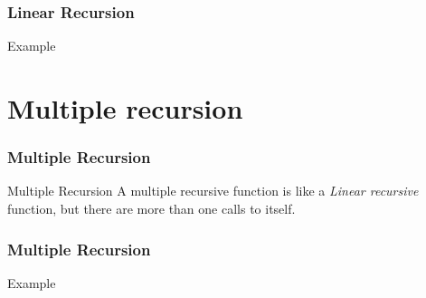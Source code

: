 \documentclass{beamer}
\begin{document}
\begin{frame}
	\frametitle{Linear Recursion}
	\begin{block}{Example}
				\begin{algorithmic}[1]
					\State{}
				\Else
					\State{}
				\EndIf
				\EndProcedure
			\end{algorithmic}
	\end{block}
\end{frame}
\section{Multiple recursion}
\begin{frame}
	\frametitle{Multiple Recursion}
	\begin{block}{Multiple Recursion}
		A multiple recursive function is like a \textit{Linear recursive} function, but there are more than one calls to itself.
				\begin{algorithmic}[1]
					\State{}
				\Else
					\State{}
				\EndIf
				\EndProcedure
			\end{algorithmic}
	\end{block}
\end{frame}
\begin{frame}
	\frametitle{Multiple Recursion}
	\begin{block}{Example}
			\begin{algorithmic}[1]
					\State{}
				\Else
						\State{}
					\Else
						\State{}
					\EndIf
				\EndIf
				\EndProcedure
			\end{algorithmic}
	\end{block}
\end{frame}
\end{document}
